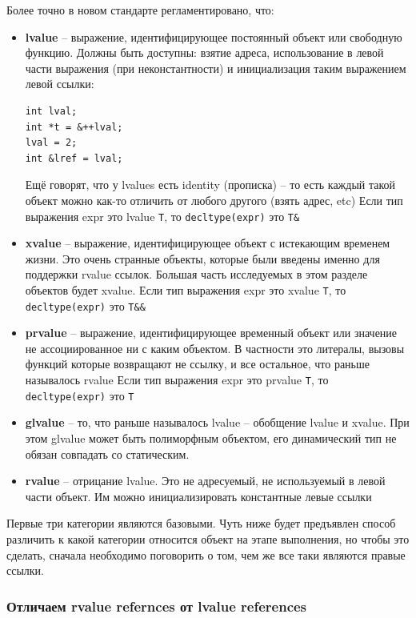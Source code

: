 \documentclass[a4paper,12pt,oneside]{article}
\begin{document}
Более точно в новом стандарте регламентировано, что:

\begin{itemize}
\item \textbf{lvalue} -- выражение, идентифицирующее постоянный объект или свободную функцию. Должны быть доступны: взятие адреса, использование в левой части выражения (при неконстантности) и инициализация таким выражением левой ссылки:
\begin{lstlisting}
int lval;
int *t = &++lval;
lval = 2;
int &lref = lval;
\end{lstlisting}
Ещё говорят, что у lvalues есть identity (прописка) -- то есть каждый такой объект можно как-то отличить от любого другого (взять адрес, etc)
Если тип выражения expr это lvalue \lstinline!T!, то \lstinline!decltype(expr)! это \lstinline!T&!
\item \textbf{xvalue} -- выражение, идентифицирующее объект с истекающим временем жизни. Это очень странные объекты, которые были введены именно для поддержки rvalue ссылок. Большая часть исследуемых в этом разделе объектов будет xvalue.
Если тип выражения expr это xvalue \lstinline!T!, то \lstinline!decltype(expr)! это \lstinline!T&&!
\item \textbf{prvalue} -- выражение, идентифицирующее временный объект или значение не ассоциированное ни с каким объектом. В частности это литералы, вызовы функций которые возвращают не ссылку, и все остальное, что раньше называлось rvalue
Если тип выражения expr это prvalue \lstinline!T!, то \lstinline!decltype(expr)! это \lstinline!T!
\item \textbf{glvalue} -- то, что раньше называлось lvalue -- обобщение lvalue и xvalue. При этом glvalue может быть полиморфным объектом, его динамический тип не обязан совпадать со статическим.
\item \textbf{rvalue} -- отрицание lvalue. Это не адресуемый, не используемый в левой части объект. Им можно инициализировать константные левые ссылки
\end{itemize}

Первые три категории являются базовыми. Чуть ниже будет предъявлен способ различить к какой категории относится объект на этапе выполнения, но чтобы это сделать, сначала необходимо поговорить о том, чем же все таки являются правые ссылки.

\subsubsection{Отличаем rvalue refernces от lvalue references}
\end{document}
